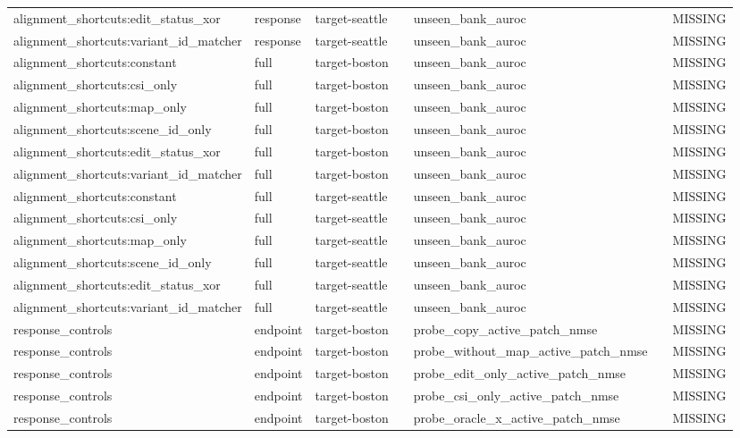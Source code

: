 \begin{longtable}{lllllll}
alignment\_shortcuts:edit\_status\_xor & response & target-seattle &  & unseen\_bank\_auroc &  & MISSING \\
alignment\_shortcuts:variant\_id\_matcher & response & target-seattle &  & unseen\_bank\_auroc &  & MISSING \\
alignment\_shortcuts:constant & full & target-boston &  & unseen\_bank\_auroc &  & MISSING \\
alignment\_shortcuts:csi\_only & full & target-boston &  & unseen\_bank\_auroc &  & MISSING \\
alignment\_shortcuts:map\_only & full & target-boston &  & unseen\_bank\_auroc &  & MISSING \\
alignment\_shortcuts:scene\_id\_only & full & target-boston &  & unseen\_bank\_auroc &  & MISSING \\
alignment\_shortcuts:edit\_status\_xor & full & target-boston &  & unseen\_bank\_auroc &  & MISSING \\
alignment\_shortcuts:variant\_id\_matcher & full & target-boston &  & unseen\_bank\_auroc &  & MISSING \\
alignment\_shortcuts:constant & full & target-seattle &  & unseen\_bank\_auroc &  & MISSING \\
alignment\_shortcuts:csi\_only & full & target-seattle &  & unseen\_bank\_auroc &  & MISSING \\
alignment\_shortcuts:map\_only & full & target-seattle &  & unseen\_bank\_auroc &  & MISSING \\
alignment\_shortcuts:scene\_id\_only & full & target-seattle &  & unseen\_bank\_auroc &  & MISSING \\
alignment\_shortcuts:edit\_status\_xor & full & target-seattle &  & unseen\_bank\_auroc &  & MISSING \\
alignment\_shortcuts:variant\_id\_matcher & full & target-seattle &  & unseen\_bank\_auroc &  & MISSING \\
response\_controls & endpoint & target-boston &  & probe\_copy\_active\_patch\_nmse &  & MISSING \\
response\_controls & endpoint & target-boston &  & probe\_without\_map\_active\_patch\_nmse &  & MISSING \\
response\_controls & endpoint & target-boston &  & probe\_edit\_only\_active\_patch\_nmse &  & MISSING \\
response\_controls & endpoint & target-boston &  & probe\_csi\_only\_active\_patch\_nmse &  & MISSING \\
response\_controls & endpoint & target-boston &  & probe\_oracle\_x\_active\_patch\_nmse &  & MISSING \\

\end{longtable}

